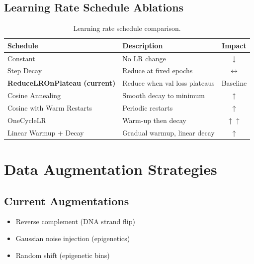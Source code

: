 \documentclass[11pt,a4paper]{article}
\begin{document}
\subsection{Learning Rate Schedule Ablations}

\begin{table}[H]
\centering
\begin{tabular}{L{4cm}L{5cm}c}
\toprule
\textbf{Schedule} & \textbf{Description} & \textbf{Impact} \\
\midrule
Constant & No LR change & \textcolor{negative}{$\downarrow$} \\
Step Decay & Reduce at fixed epochs & \textcolor{neutral}{$\leftrightarrow$} \\
\textbf{ReduceLROnPlateau (current)} & Reduce when val loss plateaus & Baseline \\
Cosine Annealing & Smooth decay to minimum & \textcolor{positive}{$\uparrow$} \\
Cosine with Warm Restarts & Periodic restarts & \textcolor{positive}{$\uparrow$} \\
OneCycleLR & Warm-up then decay & \textcolor{positive}{$\uparrow\uparrow$} \\
Linear Warmup + Decay & Gradual warmup, linear decay & \textcolor{positive}{$\uparrow$} \\
\bottomrule
\end{tabular}
\caption{Learning rate schedule comparison.}
\end{table}

\section{Data Augmentation Strategies}

\subsection{Current Augmentations}

\begin{itemize}
    \item Reverse complement (DNA strand flip)
    \item Gaussian noise injection (epigenetics)
    \item Random shift (epigenetic bins)
\end{itemize}
\end{document}
